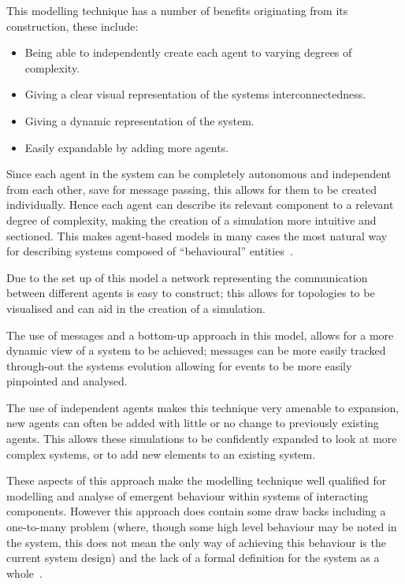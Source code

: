 \documentclass{article}
\begin{document}
This modelling technique has a number of benefits originating from its construction, these include:
\begin{itemize}
   \item Being able to independently create each agent to varying degrees of complexity. 
   \item Giving a clear visual representation of the system\textsc{}s interconnectedness.
   \item Giving a dynamic representation of the system.
   \item Easily expandable by adding more agents.  
\end{itemize} 

Since each agent in the system can be completely autonomous and independent from each other, save for message passing, this allows for them to be created individually. Hence each agent can describe its relevant component to a relevant degree of complexity, making the creation of a simulation more intuitive and sectioned. This makes agent-based models in many cases the most natural way for describing systems composed of ``behavioural'' entities~\cite{techsadsProbsabm}.

Due to the set up of this model a network representing the communication between different agents is easy to construct; this allows for topologies to be visualised and can aid in the creation of a simulation.    

The use of messages and a bottom-up approach in this model, allows for a more dynamic view of a system to be achieved; messages can be more easily tracked through-out the system\textsc{}s evolution allowing for events to be more easily pinpointed and analysed.  

The use of independent agents makes this technique very amenable to expansion, new agents can often be added with little or no change to previously existing agents. This allows these simulations to be confidently expanded to look at more complex systems, or to add new elements to an existing system.  

These aspects of this approach make the modelling technique well qualified for modelling and analyse of emergent behaviour within systems of interacting components. However this approach does contain some draw backs including a one-to-many problem (where, though some high level behaviour may be noted in the system, this does not mean the only way of achieving this behaviour is the current system design) and the lack of a formal definition for the system as a whole~\cite{agbntj}.  
\end{document}
